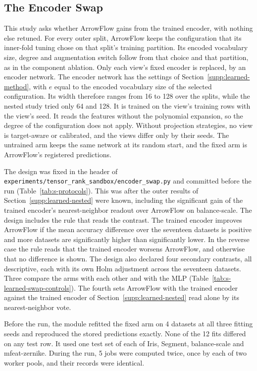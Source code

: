 \subsection{The Encoder Swap}\label{supp:learned-swap}

This study asks whether ArrowFlow gains from the trained encoder, with nothing else retuned. For every outer split, ArrowFlow keeps the configuration that its inner-fold tuning chose on that split's training partition. Its encoded vocabulary size, degree and augmentation switch follow from that choice and that partition, as in the component ablation. Only each view's fixed encoder is replaced, by an encoder network. The encoder network has the settings of Section~\ref{supp:learned-method}, with $e$ equal to the encoded vocabulary size of the selected configuration. Its width therefore ranges from 16 to 128 over the splits, while the nested study tried only 64 and 128. It is trained on the view's training rows with the view's seed. It reads the features without the polynomial expansion, so the degree of the configuration does not apply. Without projection strategies, no view is target-aware or calibrated, and the views differ only by their seeds. The untrained arm keeps the same network at its random start, and the fixed arm is ArrowFlow's registered predictions.

The design was fixed in the header of \nolinkurl{experiments/tensor_rank_sandbox/encoder_swap.py} and committed before the run (Table~\ref{tab:s-protocols}). This was after the outer results of Section~\ref{supp:learned-nested} were known, including the significant gain of the trained encoder's nearest-neighbor readout over ArrowFlow on balance-scale. The design includes the rule that reads the contrast. The trained encoder improves ArrowFlow if the mean accuracy difference over the seventeen datasets is positive and more datasets are significantly higher than significantly lower. In the reverse case the rule reads that the trained encoder worsens ArrowFlow, and otherwise that no difference is shown. The design also declared four secondary contrasts, all descriptive, each with its own Holm adjustment across the seventeen datasets. Three compare the arms with each other and with the MLP (Table~\ref{tab:s-learned-swap-controls}). The fourth sets ArrowFlow with the trained encoder against the trained encoder of Section~\ref{supp:learned-nested} read alone by its nearest-neighbor vote.

Before the run, the module refitted the fixed arm on 4 datasets at all three fitting seeds and reproduced the stored predictions exactly. None of the 12 fits differed on any test row. It used one test set of each of Iris, Segment, balance-scale and mfeat-zernike. During the run, 5 jobs were computed twice, once by each of two worker pools, and their records were identical.

